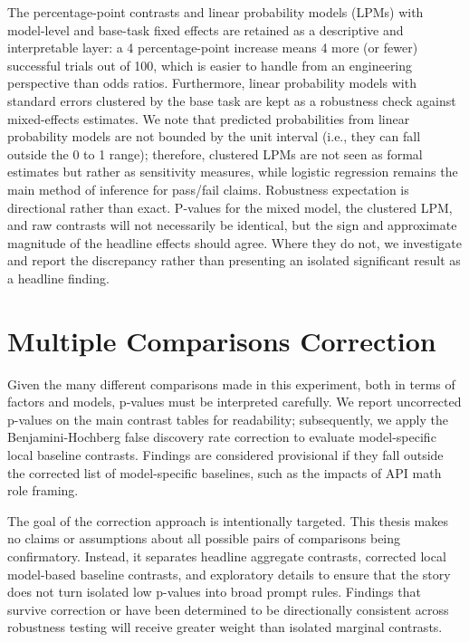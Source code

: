 The percentage-point contrasts and linear probability models (LPMs) with model-level and base-task fixed effects are retained as a descriptive and interpretable layer: a 4 percentage-point increase means 4 more (or fewer) successful trials out of 100, which is easier to handle from an engineering perspective than odds ratios. Furthermore, linear probability models with standard errors clustered by the base task are kept as a robustness check against mixed-effects estimates. We note that predicted probabilities from linear probability models are not bounded by the unit interval (i.e., they can fall outside the 0 to 1 range); therefore, clustered LPMs are not seen as formal estimates but rather as sensitivity measures, while logistic regression remains the main method of inference for pass/fail claims.
Robustness expectation is directional rather than exact. P-values for the mixed model, the clustered LPM, and raw contrasts will not necessarily be identical, but the sign and approximate magnitude of the headline effects should agree. Where they do not, we investigate and report the discrepancy rather than presenting an isolated significant result as a headline finding.

\section{Multiple Comparisons Correction}

Given the many different comparisons made in this experiment, both in terms of factors and models, p-values must be interpreted carefully. We report uncorrected p-values on the main contrast tables for readability; subsequently, we apply the Benjamini-Hochberg false discovery rate correction to evaluate model-specific local baseline contrasts. Findings are considered provisional if they fall outside the corrected list of model-specific baselines, such as the impacts of API math role framing.

The goal of the correction approach is intentionally targeted. This thesis makes no claims or assumptions about all possible pairs of comparisons being confirmatory. Instead, it separates headline aggregate contrasts, corrected local model-based baseline contrasts, and exploratory details to ensure that the story does not turn isolated low p-values into broad prompt rules. Findings that survive correction or have been determined to be directionally consistent across robustness testing will receive greater weight than isolated marginal contrasts.

